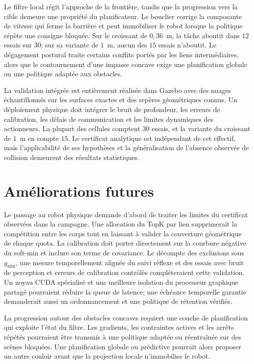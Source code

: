 Le filtre local régit l'approche de la frontière, tandis que la progression vers la cible demeure une propriété du planificateur. Le bouclier corrige la composante de vitesse qui ferme la barrière et peut immobiliser le robot lorsque la politique répète une consigne bloquée. Sur le croissant de $0{,}36$~m, la tâche aboutit dans $12$ essais sur $30$; sur sa variante de $1$~m, aucun des $15$ essais n'aboutit. Le dégagement postural traite certains conflits portés par les liens intermédiaires, alors que le contournement d'une impasse concave exige une planification globale ou une politique adaptée aux obstacles.

La validation intégrée est entièrement réalisée dans Gazebo avec des nuages échantillonnés sur les surfaces exactes et des repères géométriques connus. Un déploiement physique doit intégrer le bruit de profondeur, les erreurs de calibration, les délais de communication et les limites dynamiques des actionneurs. La plupart des cellules comptent $30$ essais, et la variante du croissant de $1$~m en compte $15$. Le certificat analytique est indépendant de cet effectif, mais l'applicabilité de ses hypothèses et la généralisation de l'absence observée de collision demeurent des résultats statistiques.

\section{Améliorations futures}\label{sec:Perspectives}

Le passage au robot physique demande d'abord de traiter les limites du certificat observées dans la campagne. Une allocation du TopK par lien supprimerait la compétition entre les corps tout en laissant à valider la couverture géométrique de chaque quota. La calibration doit porter directement sur la courbure négative du soft-min et inclure son terme de covariance. Le décompte des exclusions sous $g_{\min}$, une mesure temporellement alignée du suivi réflexe et des essais avec bruit de perception et erreurs de calibration contrôlés compléteraient cette validation. Un noyau \ac{CUDA} spécialisé et une meilleure isolation du processeur graphique partagé pourraient réduire la queue de latence; une échéance temporelle garantie demanderait aussi un ordonnancement et une politique de rétention vérifiés.

La progression autour des obstacles concaves requiert une couche de planification qui exploite l'état du filtre. Les gradients, les contraintes actives et les arrêts répétés pourraient être transmis à une politique adaptée ou réentraînée sur des scènes bloquées. Une planification globale ou prédictive pourrait alors proposer un autre couloir avant que la projection locale n'immobilise le robot.


